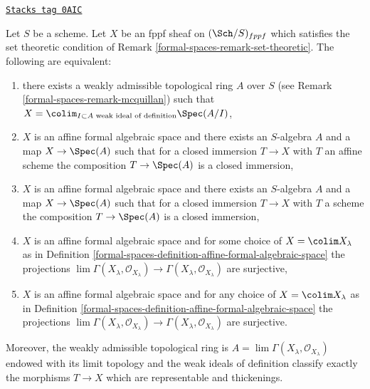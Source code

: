 \begin{lemma}
\label{formal-spaces-lemma-mcquillan-affine-formal-algebraic-space}
\href{https://stacks.math.columbia.edu/tag/0AIC}{\texttt{Stacks tag 0AIC}}

Let $S$ be a scheme. Let $X$ be an fppf sheaf on $(\Sch/S)_{fppf}$
which satisfies the set theoretic condition of
Remark \ref{formal-spaces-remark-set-theoretic}.
The following are equivalent:
\begin{enumerate}
\item there exists a weakly admissible topological ring $A$ over $S$
(see Remark \ref{formal-spaces-remark-mcquillan}) such that
$X = \colim_{I \subset A\text{ weak ideal of definition}} \Spec(A/I)$,
\item $X$ is an affine formal algebraic space and
there exists an $S$-algebra $A$ and a map $X \to \Spec(A)$
such that for a closed immersion $T \to X$ with $T$ an affine scheme
the composition $T \to \Spec(A)$ is a closed immersion,
\item $X$ is an affine formal algebraic space and
there exists an $S$-algebra $A$ and a map $X \to \Spec(A)$
such that for a closed immersion $T \to X$ with $T$ a scheme
the composition $T \to \Spec(A)$ is a closed immersion,
\item $X$ is an affine formal algebraic space and
for some choice of $X = \colim X_\lambda$ as in
Definition \ref{formal-spaces-definition-affine-formal-algebraic-space}
the projections $\lim \Gamma(X_\lambda, \mathcal{O}_{X_\lambda})
\to \Gamma(X_\lambda, \mathcal{O}_{X_\lambda})$ are surjective,
\item $X$ is an affine formal algebraic space and for any choice
of $X = \colim X_\lambda$ as in
Definition \ref{formal-spaces-definition-affine-formal-algebraic-space}
the projections $\lim \Gamma(X_\lambda, \mathcal{O}_{X_\lambda})
\to \Gamma(X_\lambda, \mathcal{O}_{X_\lambda})$ are surjective.
\end{enumerate}
Moreover, the weakly admissible topological ring is
$A = \lim \Gamma(X_\lambda, \mathcal{O}_{X_\lambda})$
endowed with its limit topology and the weak ideals of definition
classify exactly the morphisms $T \to X$ which are representable
and thickenings.
\end{lemma}

